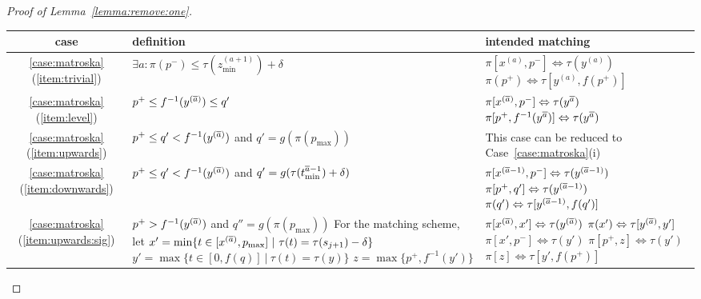 \documentclass[11pt, letter]{article}
\newcommand{\lemref}[1]{Lemma~\ref{lemma:#1}}
\newcommand{\caseref}[1]{Case~\ref{case:#1}}
\begin{document}
\begin{proof}[Proof of \lemref{remove:one}]
\begin{table}[h]
\center
\begin{tabular}{|c|m{7.5cm}|m{5cm}|}
\hline
case & definition & intended matching\\
\hline
\ref{case:matroska}(\ref{item:trivial}) & 
$\exists a: \pi(p^{-}) \leq \tau(z_{\min}^{(a+1)}) + \delta$
&
$\pi[x^{(a)},p^{-}] \Leftrightarrow \tau(y^{(a)})$\newline
$\pi(p^{+}) \Leftrightarrow \tau[y^{(a)},f(p^{+})]$\\
\hline
\ref{case:matroska}(\ref{item:level}) & 
$p^{+} \leq f^{-1}(y^{(\overline{a})}) \leq q'$
&
$\pi[x^{(\overline{a})},p^{-}]  \Leftrightarrow \tau(y^{\overline{a}})$\newline
$\pi[ p^{+}, f^{-1}(y^{\overline{a}})] \Leftrightarrow \tau(y^{\overline{a}})$ \\
\hline
\ref{case:matroska}(\ref{item:upwards}) & 
$p^+\leq q' < f^{-1}(y^{(\overline{a})})$ and \newline
$q'= g(\pi(p_{\max}))$ 
&
This case can be reduced\newline
to \caseref{matroska}(i) 
\\
\hline
\ref{case:matroska}(\ref{item:downwards}) & 
$p^+\leq  q' < f^{-1}(y^{(\overline{a})})$ and\newline
$ q' = g(\tau(t_{\min}^{\overline{a}-1})+\delta)$ 
&
$\pi[x^{(\overline{a}-1)},p^{-}] \Leftrightarrow \tau(y^{(\overline{a}-1)})$\newline
$\pi[p^{+}, q'] \Leftrightarrow \tau(y^{(\overline{a}-1)})$\newline
$\pi(q') \Leftrightarrow \tau[y^{(\overline{a}-1)}, f(q')]$
\\
\hline
\ref{case:matroska}(\ref{item:upwards:sig}) &
$p^{+} > f^{-1}(y^{(\overline{a})})$ and \newline
$q'' = g(\pi(p_{\max}))$\newline
For the matching scheme, let\newline 
$x'=\min\{t\in [x^{(\overline{a})},p_{\max}]~|~ \tau(t)=\tau(s_{j+1})-\delta \}$ \newline
$y'=\max\{t\in [0,f(q)]~|~ \tau(t)=\tau(y) \}$ \newline
$z=\max\{p^{+},f^{-1}(y')\}$ 
& 
$\pi[x^{(\overline{a})},x'] \Leftrightarrow \tau(y^{(\overline{a})})$\newline
$\pi(x') \Leftrightarrow \tau[y^{(\overline{a})},y']$\newline
$\pi[x',p^{-}] \Leftrightarrow \tau(y')$\newline
$\pi[p^{+}, z] \Leftrightarrow \tau(y')$\newline
$\pi[z] \Leftrightarrow \tau[y',f(p^{+})]$

\end{tabular}
\end{table}
\end{proof}
\end{document}
